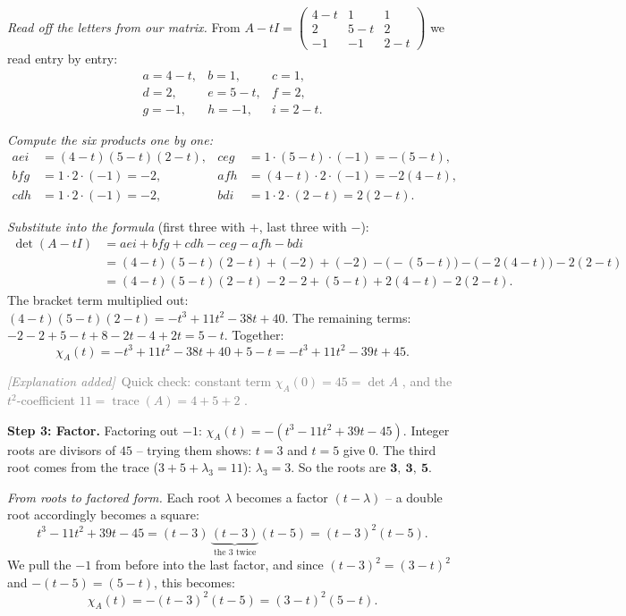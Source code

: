 \documentclass[a4paper,12pt]{article}
\newcommand{\erglerk}{\textcolor{gray}{\small\textit{[Explanation added]}}}
\begin{document}
\emph{Read off the letters from our matrix.} From $A - tI = \left(\begin{smallmatrix} 4-t & 1 & 1 \\ 2 & 5-t & 2 \\ -1 & -1 & 2-t \end{smallmatrix}\right)$ we read entry by entry:
\[
\begin{array}{lll}
a = 4-t, & b = 1, & c = 1, \\
d = 2, & e = 5-t, & f = 2, \\
g = -1, & h = -1, & i = 2-t.
\end{array}
\]

\emph{Compute the six products one by one:}
\begin{align*}
aei &= (4-t)(5-t)(2-t), & ceg &= 1\cdot(5-t)\cdot(-1) = -(5-t), \\
bfg &= 1\cdot 2\cdot(-1) = -2, & afh &= (4-t)\cdot 2\cdot(-1) = -2(4-t), \\
cdh &= 1\cdot 2\cdot(-1) = -2, & bdi &= 1\cdot 2\cdot(2-t) = 2(2-t).
\end{align*}

\emph{Substitute into the formula} (first three with $+$, last three with $-$):
\begin{align*}
\det(A - tI) &= aei + bfg + cdh - ceg - afh - bdi \\
&= (4-t)(5-t)(2-t) + (-2) + (-2) - \big(-(5-t)\big) - \big(-2(4-t)\big) - 2(2-t) \\
&= (4-t)(5-t)(2-t) - 2 - 2 + (5-t) + 2(4-t) - 2(2-t).
\end{align*}
The bracket term multiplied out: $(4-t)(5-t)(2-t) = -t^3 + 11t^2 - 38t + 40$. The remaining terms: $-2 -2 +5 -t +8 -2t -4 +2t = 5 - t$. Together:
\[
\chi_A(t) = -t^3 + 11t^2 - 38t + 40 + 5 - t = -t^3 + 11t^2 - 39t + 45.
\]

\erglerk\ \textcolor{gray}{\small Quick check: constant term $\chi_A(0) = 45 = \det A$ \checkmark, and the $t^2$-coefficient $11 = \operatorname{trace}(A) = 4+5+2$ \checkmark.}

\textbf{Step 3: Factor.} Factoring out $-1$: $\chi_A(t) = -(t^3 - 11t^2 + 39t - 45)$. Integer roots are divisors of $45$ -- trying them shows: $t = 3$ and $t = 5$ give $0$. The third root comes from the trace ($3 + 5 + \lambda_3 = 11$): $\lambda_3 = 3$. So the roots are $\mathbf{3,\ 3,\ 5}$.

\emph{From roots to factored form.} Each root $\lambda$ becomes a factor $(t - \lambda)$ -- a double root accordingly becomes a square:
\[
t^3 - 11t^2 + 39t - 45 = (t-3)\,\underbrace{(t-3)}_{\text{the } 3 \text{ twice}}(t-5) = (t-3)^2(t-5).
\]
We pull the $-1$ from before into the last factor, and since $(t-3)^2 = (3-t)^2$ and $-(t-5) = (5-t)$, this becomes:
\[
\boxed{\chi_A(t) = -(t-3)^2(t-5) = (3-t)^2(5-t).}
\]
\end{document}
